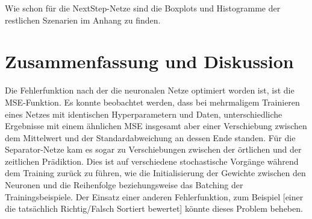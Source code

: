 Wie schon für die NextStep-Netze sind die Boxplots und Histogramme der restlichen Szenarien im Anhang zu finden.

\section{Zusammenfassung und Diskussion}


Die Fehlerfunktion nach der die neuronalen Netze optimiert worden ist, ist die MSE-Funktion.
Es konnte beobachtet werden, dass bei mehrmaligem Trainieren eines Netzes 
mit identischen Hyperparametern und Daten, unterschiedliche Ergebnisse mit einem ähnlichen MSE insgesamt aber einer Verschiebung zwischen dem Mittelwert und der Standardabweichung  
an dessen Ende standen.
Für die Separator-Netze kam es sogar zu Verschiebungen zwischen der örtlichen und der zeitlichen Prädiktion.
Dies ist auf verschiedene stochastische Vorgänge während dem Training zurück zu führen, wie die Initialisierung der Gewichte zwischen den Neuronen und die Reihenfolge beziehungsweise das Batching der Trainingsbeispiele.
Der Einsatz einer anderen Fehlerfunktion, zum Beispiel [einer die tatsächlich Richtig/Falsch Sortiert bewertet] könnte dieses Problem beheben.
